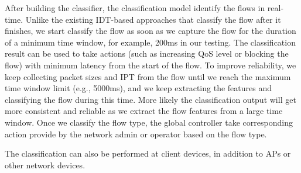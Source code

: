 \documentclass[12pt]{amsart}
\begin{document}
After building the classifier, the classification model identify the flows in real-time. Unlike the existing IDT-based approaches that classify the flow after it finishes, we start classify the flow as soon as we capture the flow for the duration of a minimum time window, for example, 200ms in our testing. The classification result can be used to take actions (such as increasing QoS level or blocking the flow) with minimum latency from the start of the flow.  To improve reliability, we keep collecting packet sizes and IPT from the flow until we reach the maximum time window limit (e.g., 5000ms), and we keep extracting the features and classifying the flow during this time. More likely the classification output will get more consistent and reliable as we extract the flow features from a large time window.  Once we classify the flow type, the global controller take corresponding action provide by the network admin or operator based on the flow type.

The classification can also be performed at client devices, in addition to APs or other network devices. 

\end{document}
